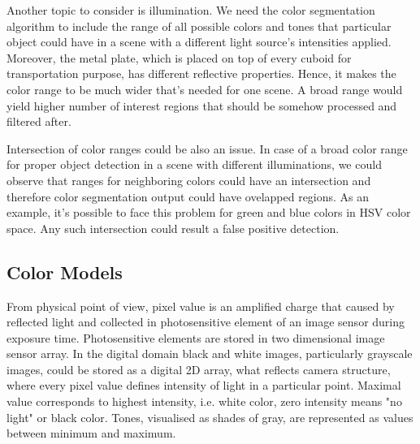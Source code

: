 \documentclass{ctuthesis}
\begin{document}
Another topic to consider is illumination. We need the color segmentation algorithm to include the range of all possible colors and tones that particular object could have in a scene with a different light source's intensities applied. Moreover, the metal plate, which is placed on top of every cuboid for transportation purpose, has different reflective properties. Hence, it makes the color range to be much wider that's needed for one scene. A broad range would yield higher number of interest regions that should be somehow processed and filtered after.

Intersection of color ranges could be also an issue. In case of a broad color range for proper object detection in a scene with different illuminations, we could observe that ranges for neighboring colors could have an intersection and therefore color segmentation output could have ovelapped regions. As an example, it's possible to face this problem for green and blue colors in HSV color space. Any such intersection could result a false positive detection.


\subsection{Color Models}
From physical point of view, pixel value is an amplified charge that caused by reflected light and collected in photosensitive element of an image sensor during exposure time. Photosensitive elements are stored in two dimensional image sensor array. In the digital domain black and white images, particularly grayscale images, could be stored as a digital 2D array, what reflects camera structure, where every pixel value defines intensity of light in a particular point. Maximal value corresponds to highest intensity, i.e. white color, zero intensity means "no light" or black color. Tones, visualised as shades of gray, are represented as values between minimum and maximum. 
\end{document}
